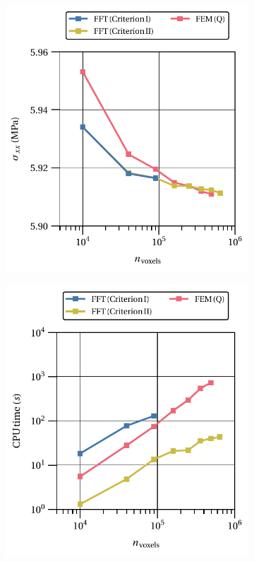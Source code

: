 \begin{figure}[hbt]
\centering
	\begin{subfigure}[b]{0.49\textwidth}
    \centering
    \includegraphics[width=\textwidth]{figures/von_mises_small_strain_2D_normal_homo_stress_11_vs_n_voxels}
    \caption{}
    \label{subfig:hencky_2D_normal_homo_stress_12_vs_n_voxels}
  \end{subfigure}
  \begin{subfigure}[b]{0.49\textwidth}
    \centering
    \includegraphics[width=\textwidth]{figures/von_mises_small_strain_2D_normal_cpu_time_vs_n_voxels}

\end{subfigure}
\end{figure}
